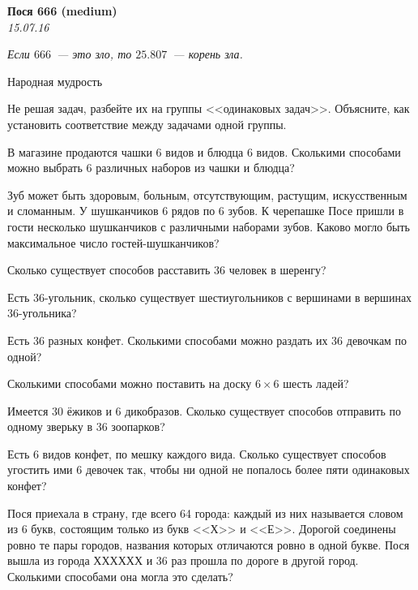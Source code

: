 \begin{center}
\textbf{\Large Пося 666 (medium)}\\
\textit{15.07.16}
\end{center}

\epigraph{\it Если $666$~--- это зло, то $25.807$~--- корень зла.}{Народная мудрость}

Не решая задач, разбейте их на группы <<одинаковых задач>>. Объясните, как установить соответствие между задачами одной группы.

\begin{problems}

\item В магазине продаются чашки 6 видов и блюдца 6 видов. Сколькими способами можно выбрать 6 различных наборов из чашки и блюдца? %

\item Зуб может быть здоровым, больным, отсутствующим, растущим, искусственным и сломанным. У шушканчиков 6 рядов по 6 зубов. К черепашке Посе пришли в гости несколько шушканчиков с различными наборами зубов. Каково могло быть максимальное число гостей-шушканчиков? %

\item Сколько существует способов расставить 36 человек в шеренгу? %

\item Есть 36-угольник, сколько существует шестиугольников с вершинами в вершинах 36-угольника? %

\item Есть 36 разных конфет. Сколькими способами можно раздать их 36 девочкам по одной? %

\item Сколькими способами можно поставить на доску $6\times6$ шесть ладей? %

\item Имеется 30 ёжиков и 6 дикобразов. Сколько существует способов отправить по одному зверьку в 36 зоопарков? %

\item Есть 6 видов конфет, по мешку каждого вида. Сколько существует способов угостить ими 6 девочек так, чтобы ни одной не попалось более пяти одинаковых конфет? %

\item Пося приехала в страну, где всего 64 города: каждый из них называется словом из 6 букв, состоящим только из букв <<Х>> и <<Е>>. Дорогой соединены ровно те пары городов, названия которых отличаются ровно в одной букве. Пося вышла из города ХХХХХХ и 36 раз прошла по дороге в другой город. Сколькими способами она могла это сделать? %


\end{problems}
